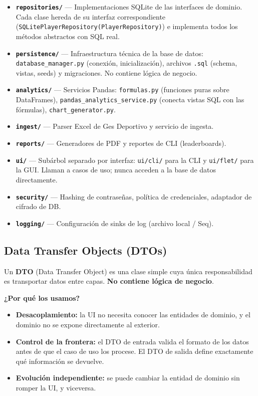 \documentclass[11pt,a4paper]{article}
\newcommand{\fpath}[1]{\texttt{\small #1}}
\begin{document}
\begin{itemize}
  \item \textbf{\fpath{repositories/}} — Implementaciones SQLite de las interfaces de dominio. Cada clase hereda de su interfaz correspondiente (\fpath{SQLitePlayerRepository(PlayerRepository)}) e implementa todos los métodos abstractos con SQL real.

  \item \textbf{\fpath{persistence/}} — Infraestructura técnica de la base de datos: \fpath{database\_manager.py} (conexión, inicialización), archivos \fpath{.sql} (schema, vistas, seeds) y migraciones. No contiene lógica de negocio.

  \item \textbf{\fpath{analytics/}} — Servicios Pandas: \fpath{formulas.py} (funciones puras sobre DataFrames), \fpath{pandas\_analytics\_service.py} (conecta vistas SQL con las fórmulas), \fpath{chart\_generator.py}.

  \item \textbf{\fpath{ingest/}} — Parser Excel de Ges Deportivo y servicio de ingesta.

  \item \textbf{\fpath{reports/}} — Generadores de PDF y reportes de CLI (leaderboards).

  \item \textbf{\fpath{ui/}} — Subárbol separado por interfaz: \fpath{ui/cli/} para la CLI y \fpath{ui/flet/} para la GUI. Llaman a casos de uso; nunca acceden a la base de datos directamente.

  \item \textbf{\fpath{security/}} — Hashing de contraseñas, política de credenciales, adaptador de cifrado de DB.

  \item \textbf{\fpath{logging/}} — Configuración de sinks de log (archivo local / Seq).
\end{itemize}

\subsection{Data Transfer Objects (DTOs)}
\label{sec:dtos}

Un \textbf{DTO} (Data Transfer Object) es una clase simple cuya única responsabilidad es transportar datos entre capas. \textbf{No contiene lógica de negocio}.

\textbf{¿Por qué los usamos?}
\begin{itemize}[nosep]
  \item \textbf{Desacoplamiento:} la UI no necesita conocer las entidades de dominio, y el dominio no se expone directamente al exterior.
  \item \textbf{Control de la frontera:} el DTO de entrada valida el formato de los datos antes de que el caso de uso los procese. El DTO de salida define exactamente qué información se devuelve.
  \item \textbf{Evolución independiente:} se puede cambiar la entidad de dominio sin romper la UI, y viceversa.
\end{itemize}
\end{document}
